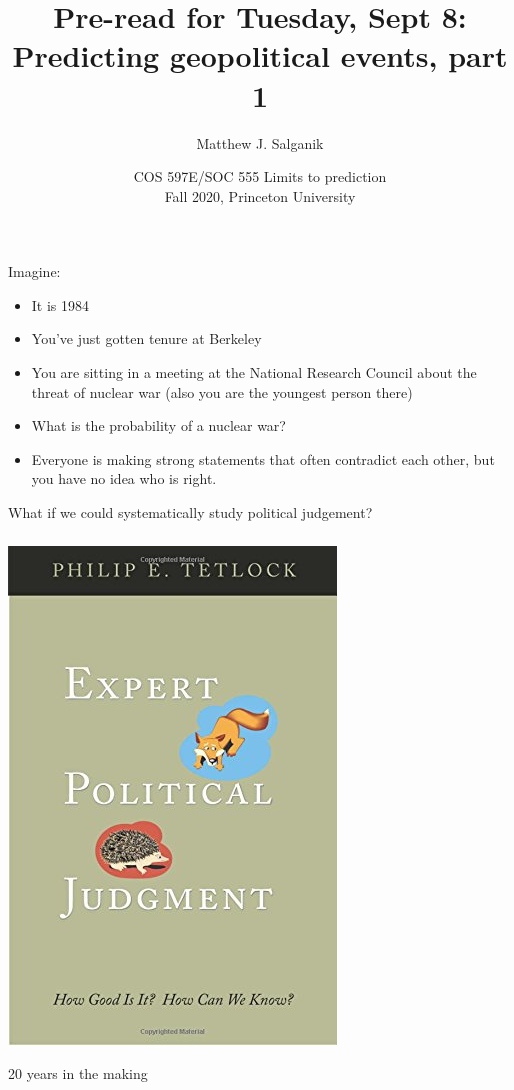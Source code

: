 \documentclass[aspectratio=169]{beamer}
\title[]{Pre-read for Tuesday, Sept 8:\\
Predicting geopolitical events, part 1}
\author[]{Matthew J. Salganik}
\institute[]{}
\date[]{COS 597E/SOC 555 Limits to prediction\\Fall 2020, Princeton University}
\begin{document}
\frame{\titlepage}
\begin{frame}
\frametitle{}

Imagine:
\begin{itemize}
\item It is 1984
\pause
\item You've just gotten tenure at Berkeley
\pause 
\item You are sitting in a meeting at the National Research Council about the threat of nuclear war (also you are the youngest person there)
\pause
\item What is the probability of a nuclear war?
\pause
\item Everyone is making strong statements that often contradict each other, but you have no idea who is right.
\end{itemize}

\pause
What if we could systematically study political judgement? 

\end{frame}
\begin{frame}
\frametitle{}

\begin{center}
\includegraphics[height=0.7\textheight]{figures/tetlock_expert_2005_cover}
\end{center}

\vfill
20 years in the making

\end{frame}
\end{document}
